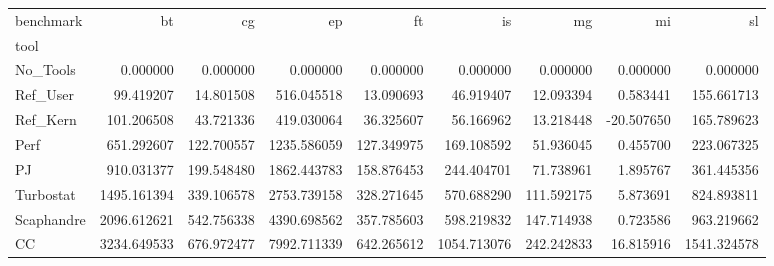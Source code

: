 \begin{tabular}{lrrrrrrrr}
\toprule
benchmark & bt & cg & ep & ft & is & mg & mi & sl \\
tool &  &  &  &  &  &  &  &  \\
\midrule
No_Tools & 0.000000 & 0.000000 & 0.000000 & 0.000000 & 0.000000 & 0.000000 & 0.000000 & 0.000000 \\
Ref_User & 99.419207 & 14.801508 & 516.045518 & 13.090693 & 46.919407 & 12.093394 & 0.583441 & 155.661713 \\
Ref_Kern & 101.206508 & 43.721336 & 419.030064 & 36.325607 & 56.166962 & 13.218448 & -20.507650 & 165.789623 \\
Perf & 651.292607 & 122.700557 & 1235.586059 & 127.349975 & 169.108592 & 51.936045 & 0.455700 & 223.067325 \\
PJ & 910.031377 & 199.548480 & 1862.443783 & 158.876453 & 244.404701 & 71.738961 & 1.895767 & 361.445356 \\
Turbostat & 1495.161394 & 339.106578 & 2753.739158 & 328.271645 & 570.688290 & 111.592175 & 5.873691 & 824.893811 \\
Scaphandre & 2096.612621 & 542.756338 & 4390.698562 & 357.785603 & 598.219832 & 147.714938 & 0.723586 & 963.219662 \\
CC & 3234.649533 & 676.972477 & 7992.711339 & 642.265612 & 1054.713076 & 242.242833 & 16.815916 & 1541.324578 \\
\bottomrule
\end{tabular}

